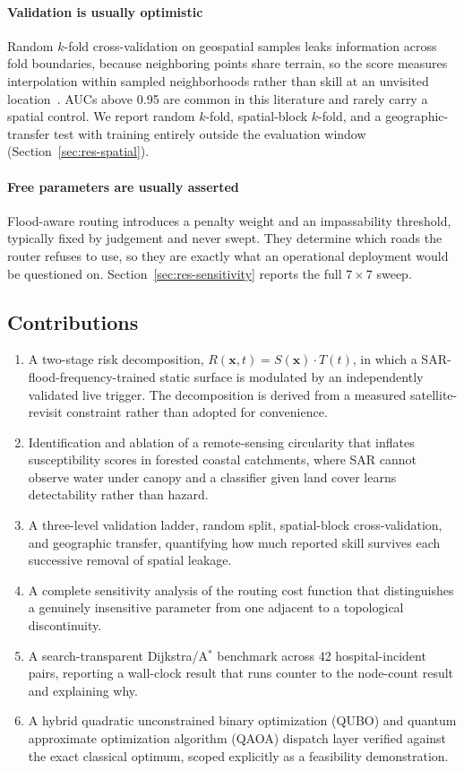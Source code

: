 \documentclass[10pt,twocolumn]{article}
\newcommand{\Sx}{S(\mathbf{x})}
\newcommand{\Tt}{T(t)}
\newcommand{\Rxt}{R(\mathbf{x},t)}
\begin{document}
\paragraph{Validation is usually optimistic}
Random $k$-fold cross-validation on geospatial samples leaks information across
fold boundaries, because neighboring points share terrain, so the score measures
interpolation within sampled neighborhoods rather than skill at an unvisited
location~\citep{roberts2017,ploton2020,meyer2021}. AUCs above 0.95 are common in
this literature and rarely carry a spatial control. We report random $k$-fold,
spatial-block $k$-fold, and a geographic-transfer test with training entirely
outside the evaluation window (Section~\ref{sec:res-spatial}).

\paragraph{Free parameters are usually asserted}
Flood-aware routing introduces a penalty weight and an impassability threshold,
typically fixed by judgement and never swept. They determine which roads the
router refuses to use, so they are exactly what an operational deployment would
be questioned on. Section~\ref{sec:res-sensitivity} reports the full
$7\times7$ sweep.

\subsection{Contributions}
\begin{enumerate}
\itemsep2pt
\item A two-stage risk decomposition, $\Rxt=\Sx\cdot\Tt$, in which a
      SAR-flood-frequency-trained static surface is modulated by an independently
      validated live trigger. The decomposition is derived from a measured
      satellite-revisit constraint rather than adopted for convenience.
\item Identification and ablation of a remote-sensing circularity that inflates
      susceptibility scores in forested coastal catchments, where SAR cannot
      observe water under canopy and a classifier given land cover learns
      detectability rather than hazard.
\item A three-level validation ladder, random split, spatial-block
      cross-validation, and geographic transfer, quantifying how much reported
      skill survives each successive removal of spatial leakage.
\item A complete sensitivity analysis of the routing cost function that
      distinguishes a genuinely insensitive parameter from one adjacent to a
      topological discontinuity.
\item A search-transparent Dijkstra/A$^\ast$ benchmark across 42
      hospital-incident pairs, reporting a wall-clock result that runs counter to
      the node-count result and explaining why.
\item A hybrid quadratic unconstrained binary optimization (QUBO) and quantum approximate optimization algorithm (QAOA) dispatch layer verified against the exact classical
      optimum, scoped explicitly as a feasibility demonstration.
\end{enumerate}
\end{document}
